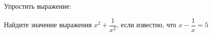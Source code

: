 \begin{listofex}
	\item Упростить выражение:
	\begin{enumcols}[itemcolumns=2]
		\item {}
		\item {}
		\item {}
		\item {}
		\item {}
		\item {}
		
		
	\end{enumcols}

	\item {}
	
	\item {}
	
	\item Найдите значение выражения \( x^2+\dfrac{1}{x^2} \), если известно, что \( x-\dfrac{1}{x}=5 \)
	

\end{listofex}
